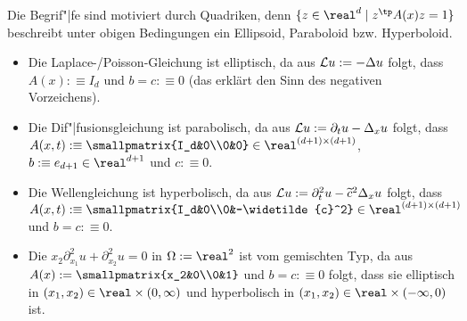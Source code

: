 \begin{Bem}
    Die Begrif"|fe sind motiviert durch Quadriken,
    denn $\{z \in \real^d \;|\; z^\tp A(x) z = 1\}$ beschreibt unter obigen Bedingungen
    ein Ellipsoid, Paraboloid bzw. Hyperboloid.
\end{Bem}

\begin{Bsp}
    \begin{itemize}
        \item
        Die Laplace-/Poisson-Gleichung ist elliptisch, da aus $\mathcal{L} u := -\Delta u$ folgt,
        dass $A(x) :\equiv I_d$ und $b = c :\equiv 0$
        (das erklärt den Sinn des negativen Vorzeichens).
        
        \item
        Die Dif"|fusionsgleichung ist parabolisch, da aus $\mathcal{L} u := \partial_t u - \Delta_x u$
        folgt, dass\\
        $A(x, t) :\equiv \smallpmatrix{I_d&0\\0&0} \in \real^{(d+1)\times(d+1)}$,
        $b :\equiv e_{d+1} \in \real^{d+1}$ und $c :\equiv 0$.
        
        \item
        Die Wellengleichung ist hyperbolisch, da aus
        $\mathcal{L} u := \partial_t^2 u - \widetilde{c}^2 \Delta_x u$ folgt, dass\\
        $A(x, t) :\equiv \smallpmatrix{I_d&0\\0&-\widetilde{c}^2} \in \real^{(d+1)\times(d+1)}$ und
        $b = c :\equiv 0$.
        
        \item
        Die  $x_2 \partial_{x_1}^2 u + \partial_{x_2}^2 u = 0$
        in $\Omega := \real^2$ ist vom gemischten Typ, da aus $A(x) := \smallpmatrix{x_2&0\\0&1}$ 
        und $b = c :\equiv 0$ folgt, dass sie
        elliptisch in $(x_1, x_2) \in \real \times (0, \infty)$ und
        hyperbolisch in $(x_1, x_2) \in \real \times (-\infty, 0)$ ist.
    \end{itemize}
\end{Bsp}

\linie

